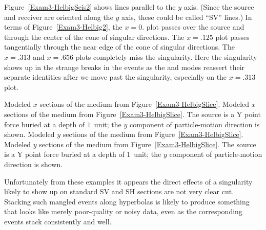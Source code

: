 Figure~\ref{Exam3-HelbigSeis2} shows lines parallel to the $y$ axis.
(Since the source and receiver are oriented along the $y$ axis,
these could be called ``SV'' lines.)
In terms of Figure~\ref{Exam3-Helbig2},
the $x=0.$ plot passes over the source and
through the center of the cone of singular directions.
The $x=.125$ plot passes tangentially through the near edge of the
cone of singular directions.
The $x=.313$ and $x=.656$ plots completely miss the singularity.
Here the singularity shows up in the strange breaks in the events
as the {} and {} modes reassert their separate identities after
we move past the singularity, especially on the $x=.313$ plot.

{Modeled $x$ sections of the medium
from Figure~\protect\ref{Exam3-HelbigSlice}.}
{
Modeled $x$ sections of the medium
from Figure~\protect\ref{Exam3-HelbigSlice}.
The source is a Y point force buried at a depth of $1$~unit;
the $y$ component of particle-motion direction is shown.
}
{Modeled $y$ sections of the medium
from Figure~\protect\ref{Exam3-HelbigSlice}.}
{
Modeled $y$ sections of the medium
from Figure~\protect\ref{Exam3-HelbigSlice}.
The source is a Y point force buried at a depth of $1$~unit;
the $y$ component of particle-motion direction is shown.
}

Unfortunately from these examples it appears the direct effects
of a singularity likely to show up on standard SV and SH sections
are not very clear cut. Stacking such mangled events along hyperbolas
is likely to produce something that looks like merely poor-quality or
noisy data, even as the corresponding {\qP} events
stack consistently and well.

